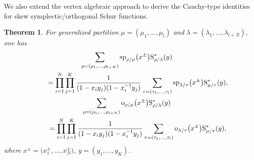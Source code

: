 \documentclass[10pt,a4paper]{amsart}
\numberwithin{equation}{section}
\newtheorem{Theorem}{Theorem}[section]
\begin{document}
We also extend the vertex algebraic approach to derive the Cauchy-type identities for skew symplectic/orthogonal Schur functions.
\begin{Theorem}For generalized partition $\mu=(\mu_1,\dots,\mu_l)$ and $\lambda=(\lambda_1,\dots,\lambda_{l+N})$, one has
\begin{gather}
\sum_{\rho=(\rho_1,\dots,\rho_{l+N}) }{\rm sp}_{\rho/\mu}\big(x^{\pm}\big){\rm S}^*_{\rho/\lambda}(y){}\nonumber\\
\qquad\quad{}=\prod^N_{i=1}\prod^K_{j=1}\frac{1}{(1-x_iy_j)(1-x^{-1}_iy_j)}\sum_{\tau=(\tau_1,\dots,\tau_l)}{\rm sp}_{\lambda/\tau}\big(x^{\pm}\big){\rm S}^*_{\mu/\tau}(y),\label{e:sp16}\\
\sum_{\rho=(\rho_1,\dots,\rho_{l+N})}{\rm o}_{\rho/\mu}\big(x^{\pm}\big){\rm S}^*_{\rho/\lambda}(y)\nonumber\\
\qquad\quad{}=\prod^N_{i=1}\prod^K_{j=1}\frac{1}{(1-x_iy_j)(1-x^{-1}_iy_j)}\sum_{\tau=(\tau_1,\dots,\tau_l)}{\rm o}_{\lambda/\tau}\big(x^{\pm}\big){\rm S}^*_{\mu/\tau}(y),\label{e:o12}
\end{gather}
where $x^{\pm}=\big(x^{\pm}_1,\dots,x^{\pm}_N\big)$, $y=(y_1,\dots,y_K)$.
\end{Theorem}
\end{document}
